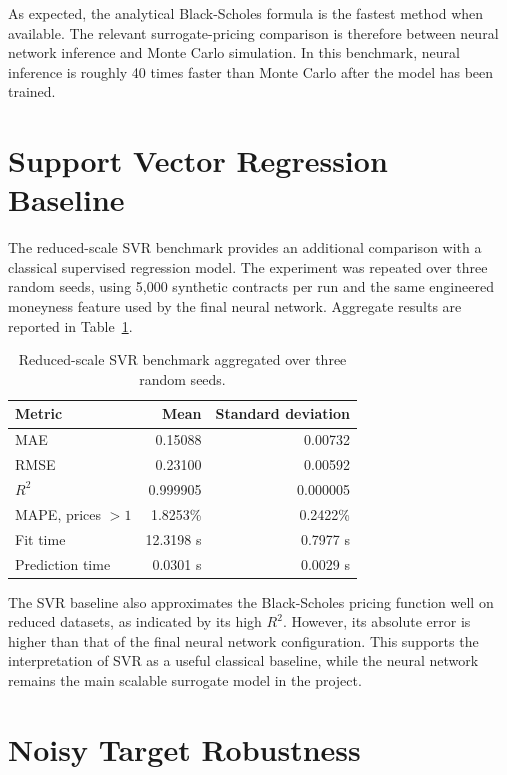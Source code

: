 As expected, the analytical Black-Scholes formula is the fastest method when available.
The relevant surrogate-pricing comparison is therefore between neural network inference and Monte Carlo simulation.
In this benchmark, neural inference is roughly 40 times faster than Monte Carlo after the model has been trained.

\section{Support Vector Regression Baseline}

The reduced-scale SVR benchmark provides an additional comparison with a classical supervised regression model.
The experiment was repeated over three random seeds, using 5,000 synthetic contracts per run and the same engineered moneyness feature used by the final neural network.
Aggregate results are reported in Table~\ref{tab:svr-benchmark}.

\begin{table}[H]
    \centering
    \begin{tabular}{lrr}
        \toprule
        Metric & Mean & Standard deviation \\
        \midrule
        MAE & 0.15088 & 0.00732 \\
        RMSE & 0.23100 & 0.00592 \\
        $R^2$ & 0.999905 & 0.000005 \\
        MAPE, prices $> 1$ & 1.8253\% & 0.2422\% \\
        Fit time & 12.3198 s & 0.7977 s \\
        Prediction time & 0.0301 s & 0.0029 s \\
        \bottomrule
    \end{tabular}
    \caption{Reduced-scale SVR benchmark aggregated over three random seeds.}
    \label{tab:svr-benchmark}
\end{table}

The SVR baseline also approximates the Black-Scholes pricing function well on reduced datasets, as indicated by its high $R^2$.
However, its absolute error is higher than that of the final neural network configuration.
This supports the interpretation of SVR as a useful classical baseline, while the neural network remains the main scalable surrogate model in the project.

\section{Noisy Target Robustness}

